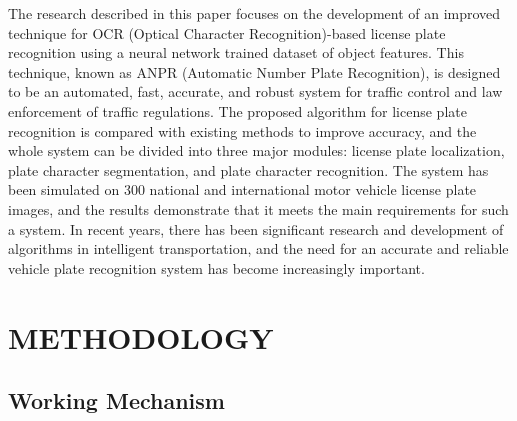\big[7\big]The research described in this paper focuses on the development of an improved technique for OCR (Optical Character Recognition)-based license plate recognition using a neural network trained dataset of object features. This technique, known as \ac{ANPR} (Automatic Number Plate Recognition), is designed to be an automated, fast, accurate, and robust system for traffic control and law enforcement of traffic regulations. The proposed algorithm for license plate recognition is compared with existing methods to improve accuracy, and the whole system can be divided into three major modules: license plate localization, plate character segmentation, and plate character recognition. The system has been simulated on 300 national and international motor vehicle license plate images, and the results demonstrate that it meets the main requirements for such a system. In recent years, there has been significant research and development of algorithms in intelligent transportation, and the need for an accurate and reliable vehicle plate recognition system has become increasingly important.







\chapter{METHODOLOGY}

\section{Working Mechanism}

